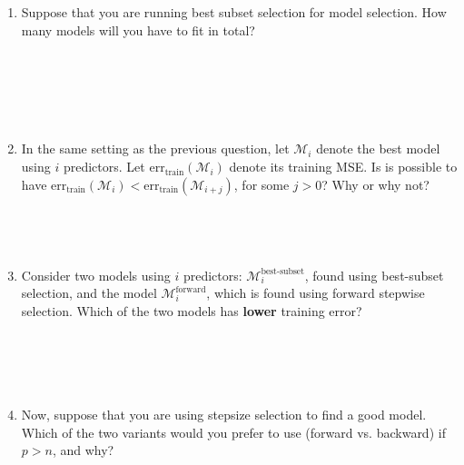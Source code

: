 \documentclass{article}
\begin{document}
\begin{enumerate}
    \item Suppose that you are running best subset selection for model
    selection. How many models will you have to fit in total?
    \begin{Verbatim}[frame=single]
    
    
    
    
    
    \end{Verbatim}
    \item In the same setting as the previous question, let $\mathcal{M}_i$
    denote the best model using $i$ predictors. Let
    $\mathrm{err}_{\mathrm{train}}(\mathcal{M}_i)$ denote its training MSE.
    Is is
    possible to have $\mathrm{err}_{\mathrm{train}}(\mathcal{M}_i) <
    \mathrm{err}_{\mathrm{train}}(\mathcal{M}_{i + j})$, for some $j > 0$?
    Why or why not?
    \begin{Verbatim}[frame=single]
    
    
    
    \end{Verbatim}

    \item Consider two models using $i$ predictors:
    $\mathcal{M}_i^{\textrm{best-subset}}$, found using best-subset selection,
    and the model $\mathcal{M}_i^{\textrm{forward}}$, which is found using
    forward stepwise selection. Which of the two models has \textbf{lower}
    training error?

    \begin{Verbatim}[frame=single]
    
    
    
    
    \end{Verbatim}

    \item Now, suppose that you are using stepsize selection to find a
    good model. Which of the two variants would you prefer to use (forward vs.
    backward) if $p > n$, and why?
    \begin{Verbatim}[frame=single]
    
    
    
    \end{Verbatim}


\end{enumerate}
\end{document}
